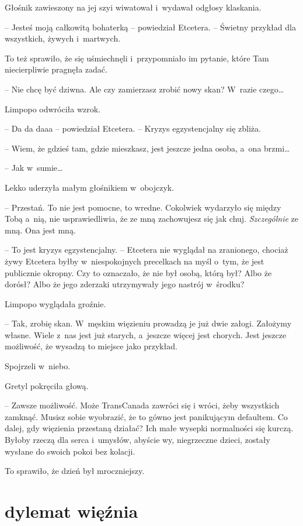 \documentclass[oneside,polish,11pt,sfheadings]{mwbk}
\begin{document}
Głośnik zawieszony na jej szyi wiwatował i~wydawał odgłosy klaskania. 

-- Jesteś moją całkowitą bohaterką -- powiedział Etcetera. -- Świetny
przykład dla wszystkich, żywych i~martwych.

To też sprawiło, że się uśmiechnęli i~przypomniało im pytanie, które Tam
niecierpliwie pragnęła zadać. 

-- Nie chcę być dziwna. Ale czy zamierzasz
zrobić nowy skan? W~razie czego\ldots 

Limpopo odwróciła wzrok.

-- Da da daaa -- powiedział Etcetera. -- Kryzys egzystencjalny się zbliża.

-- Wiem, że gdzieś tam, gdzie mieszkasz, jest jeszcze jedna osoba, a~ona
brzmi\ldots 

-- Jak w~sumie\ldots 

Lekko uderzyła małym głośnikiem w~obojczyk. 

-- Przestań. To nie jest
pomocne, to wredne. Cokolwiek wydarzyło się między Tobą a~nią, nie
usprawiedliwia, że ze mną zachowujesz się jak chuj. \textit{Szczególnie}
ze mną. Ona jest mną.

-- To jest kryzys egzystencjalny. -- Etcetera nie wyglądał na zranionego,
chociaż żywy Etcetera byłby w~niespokojnych precelkach na myśl o~tym, że
jest publicznie okropny. Czy to oznaczało, że nie był osobą, którą był?
Albo że dorósł? Albo że jego zderzaki utrzymywały jego nastrój w~środku?

Limpopo wyglądała groźnie. 

-- Tak, zrobię skan. W~męskim więzieniu
prowadzą je już dwie załogi. Założymy własne. Wiele z~nas jest już
starych, a~jeszcze więcej jest chorych. Jest jeszcze możliwość, że
wysadzą to miejsce jako przykład.

Spojrzeli w~niebo.

Gretyl pokręciła głową. 

-- Zawsze możliwość. Może TransCanada zawróci się
i wróci, żeby wszystkich zamknąć. Musisz sobie wyobrazić, że to gówno
jest panikującym defaultem. Co dalej, gdy więzienia przestaną działać?
Ich małe wysepki normalności się kurczą. Byłoby rzeczą dla serca i~umysłów, abyście wy, niegrzeczne dzieci, zostały wysłane do swoich pokoi
bez kolacji.

To sprawiło, że dzień był mroczniejszy.

\part{dylemat więźnia}
\end{document}
